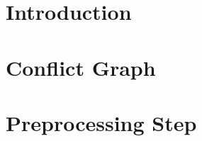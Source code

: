 \documentclass[preprint,12pt]{elsarticle}
\begin{document}
\begin{frontmatter}



\title{}


\author{}

\address{}

\begin{abstract}

\end{abstract}

\begin{keyword}



\end{keyword}

\end{frontmatter}


\section{Introduction}

\section{Conflict Graph}

\section{Preprocessing Step}\label{preprocessing}
\end{document}
